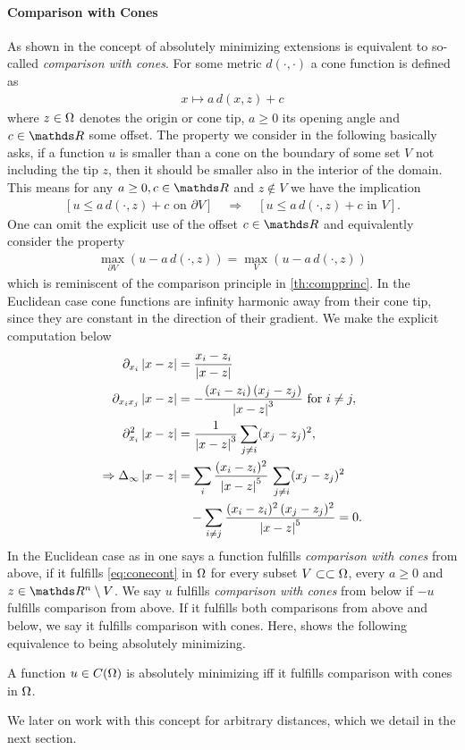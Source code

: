 \paragraph{Comparison with Cones} As shown in \cite{aronsson2004tour} the concept of absolutely minimizing extensions is equivalent to so-called \emph{comparison with cones}. For some metric $d(\cdot,\cdot)$ a cone function is defined as
%
\begin{align*}
x\mapsto a\, d(x,z) + c
\end{align*}
%
where $z\in\Omega$ denotes the origin or cone tip, $a\geq 0$ its opening angle and $c\in\R$ some offset. The property we consider in the following basically asks, if a function $u$ is smaller than a cone on the boundary of some set $V$ not including the tip $z$, then it should be smaller also in the interior of the domain. This means for any $a\geq 0,c\in\R$ and $z\notin V$ we have the implication
%
\begin{align*}
\left[u \leq a\, d(\cdot,z) + c \text{ on }\partial V\right]
\quad \Rightarrow\quad
\left[u \leq a\, d(\cdot,z) + c \text{ in } V\right].
\end{align*}
%
%
One can omit the explicit use of the offset $c\in\R$ and equivalently consider the property
%
\begin{align}\label{eq:conecont}
\max_{\partial V}\left(u - a\, d(\cdot,z)\right) = \max_{V}\left(u - a\, d(\cdot,z)\right)
\end{align}
%
which is reminiscent of the comparison principle in \cref{th:compprinc}. In the Euclidean case cone functions are infinity harmonic away from their cone tip, since they are constant in the direction of their gradient. We make the explicit computation below
%
\begin{align*}
\partial_{x_i} \abs{x-z} &= \frac{x_i - z_i}{\abs{x-z}}\\
\partial_{x_i x_j}\abs{x-z} &= -\frac{(x_i - z_i)\, (x_j - z_j)}{\abs{x-z}^3}\text{ for } i\neq j,\\
\partial_{x_i}^2\abs{x-z} &= \frac{1}{\abs{x-z}^3} \sum_{j\neq i} (x_j - z_j)^2,\\
\Rightarrow
\Delta_\infty \abs{x-z} &= 
%
\sum_{i} \frac{(x_i - z_i)^2}{\abs{x-z}^5} \, \sum_{j\neq i} (x_j - z_j)^2\\
&\quad-\sum_{i\neq j}\frac{(x_i - z_i)^2\, (x_j - z_j)^2}{\abs{x-z}^5} = 0.
\end{align*}
%
%
In the Euclidean case as in \cite{aronsson2004tour} one says a function fulfills \emph{comparison with cones} from above, if it fulfills \cref{eq:conecont} in $\Omega$ for every subset $V\subset\subset\Omega$, every $a\geq 0$ and $z\in\R^n\setminus V$. We say $u$ fulfills \emph{comparison with cones} from below if $-u$ fulfills comparison from above. If it fulfills both comparisons from above and below, we say it fulfills comparison with cones. Here, \cite{aronsson2004tour} shows the following equivalence to being absolutely minimizing.
%
\begin{theorem}{\cite[Prop. 2.1]{aronsson2004tour}}{}
A function $u\in C(\Omega)$ is absolutely minimizing iff it fulfills comparison with cones in $\Omega$.
\end{theorem}
%
We later on work with this concept for arbitrary distances, which we detail in the next section.
%
%
